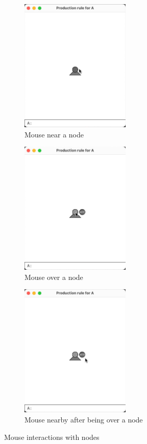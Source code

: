 \documentclass[12pt,twoside]{reedthesis}
\begin{document}
	\begin{figure}[h]
	\centering
	\begin{subfigure}{0.5\textwidth}
		\centering
		\includegraphics[height = 2.5in]{Images/HowItWorks4A}
		\caption{Mouse near a node}
		\label {HowItWorks4A}
	\end{subfigure}%
	\begin{subfigure}{0.5\textwidth}
		\centering
		\includegraphics[height = 2.5in]{Images/HowItWorks4B}
		\caption{Mouse over a node}
		\label {HowItWorks4B}
	\end{subfigure}
	\begin{subfigure}{0.5\textwidth}
		\centering
		\includegraphics[height = 2.5in]{Images/HowItWorks4C}
		\caption{Mouse nearby after being over a node}
		\label {HowItWorks4C}
	\end{subfigure}
	\caption{Mouse interactions with nodes}
	\label{MouseInteraction}
	\end{figure}
\end{document}
